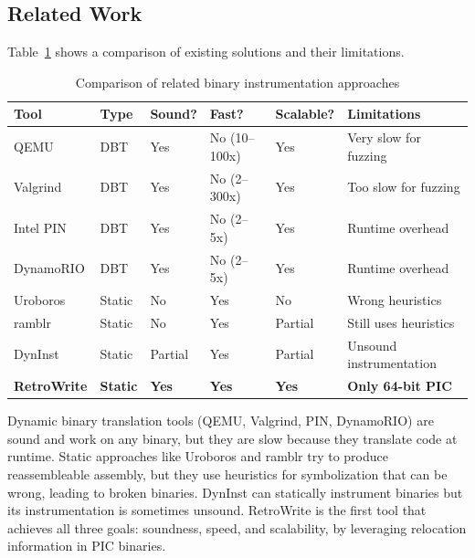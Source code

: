 \documentclass[10pt,a4paper]{article}
\begin{document}
\subsection{Related Work}

Table~\ref{tab:related} shows a comparison of existing solutions and their limitations.

\begin{table}[H]
\centering
\caption{Comparison of related binary instrumentation approaches}
\label{tab:related}
\small
\begin{tabular}{p{2.5cm}p{1.5cm}p{1.5cm}p{1.5cm}p{1.5cm}p{3cm}}
\toprule
\textbf{Tool} & \textbf{Type} & \textbf{Sound?} & \textbf{Fast?} & \textbf{Scalable?} & \textbf{Limitations} \\
\midrule
\rowcolor{rowgray} QEMU \cite{qemu} & DBT & Yes & No (10--100x) & Yes & Very slow for fuzzing \\
Valgrind \cite{valgrind} & DBT & Yes & No (2--300x) & Yes & Too slow for fuzzing \\
\rowcolor{rowgray} Intel PIN \cite{pin} & DBT & Yes & No (2--5x) & Yes & Runtime overhead \\
DynamoRIO \cite{dynamorio} & DBT & Yes & No (2--5x) & Yes & Runtime overhead \\
\rowcolor{rowgray} Uroboros \cite{uroboros} & Static & No & Yes & No & Wrong heuristics \\
ramblr \cite{ramblr} & Static & No & Yes & Partial & Still uses heuristics \\
\rowcolor{rowgray} DynInst \cite{dyninst} & Static & Partial & Yes & Partial & Unsound instrumentation \\
\rowcolor{accent!10} \textbf{RetroWrite} \cite{retrowrite} & \textbf{Static} & \textbf{Yes} & \textbf{Yes} & \textbf{Yes} & \textbf{Only 64-bit PIC} \\
\bottomrule
\end{tabular}
\end{table}

Dynamic binary translation tools (QEMU, Valgrind, PIN, DynamoRIO) are sound and work on any binary, but they are slow because they translate code at runtime. Static approaches like Uroboros and ramblr try to produce reassembleable assembly, but they use heuristics for symbolization that can be wrong, leading to broken binaries. DynInst can statically instrument binaries but its instrumentation is sometimes unsound. RetroWrite is the first tool that achieves all three goals: soundness, speed, and scalability, by leveraging relocation information in PIC binaries.
\end{document}
